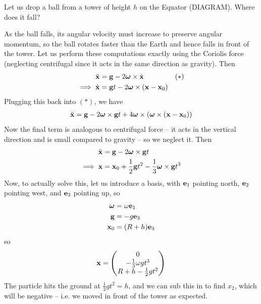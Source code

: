 \documentclass{../template/note}
\begin{document}
    \begin{example*}
        Let us drop a ball from a tower of height \(h\) on the Equator (DIAGRAM). Where does it fall?

        As the ball falls, its angular velocity must increase to preserve angular momentum, so the ball rotates faster than the Earth and hence falls in front of the tower. Let us perform these computations exactly using the Coriolis force (neglecting centrifugal since it acts in the same direction as gravity). Then
        \begin{align*}
            \ddot{\V x} &= \V g - 2 \V \omega \times \dot{\V x}  && (*)\\
            \implies \dot{\V x} &= \V g t - 2 \V \omega \times (\V x - \V x_0)
        \end{align*}
        Plugging this back into \((*)\), we have
        \begin{align*}
            \ddot{\V x} = \V g - 2 \V \omega \times \V g t + 4 \V \omega \times (\V \omega \times (\V x - \V x_0))
        \end{align*}
        Now the final term is analogous to centrifugal force -- it acts in the vertical direction and is small compared to gravity -- so we neglect it. Then
        \begin{align*}
            \ddot{\V x} &= \V g - 2 \V \omega \times \V g t \\
            \implies \V x &= \V x_0 + \frac 1 2 \V g t^2 - \frac 1 3 \V \omega \times \V g t^3
        \end{align*}
        Now, to actually solve this, let us introduce a basis, with \(\V e_1\) pointing north, \(\V e_2\) pointing west, and \(\V e_3\) pointing up, so
        \begin{align*}
            \V \omega &= \omega \V e_1 \\
            \V g &= -g \V e_3 \\
            \V x_0 &= (R+h) \V e_3
        \end{align*}
        so
        \begin{align*}
            \V x = \begin{pmatrix}
             0 \\
             -\frac 1 3 \omega gt^3 \\
             R + h - \frac 1 2 gt^2 \\
            \end{pmatrix}
        \end{align*}
        The particle hits the ground at \(\frac 1 2 gt^2 = h\), and we can sub this in to find \(x_2\), which will be negative -- i.e. we moved in front of the tower as expected.
    \end{example*}
    
\end{document}
